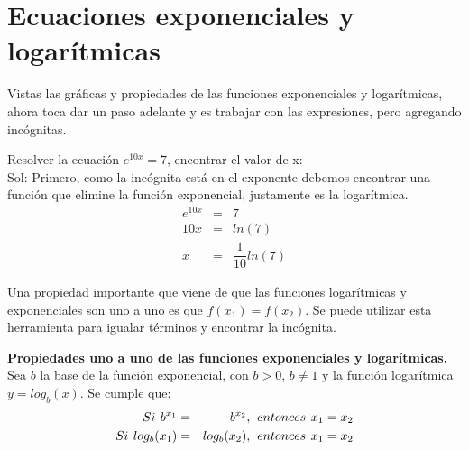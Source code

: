 \section{Ecuaciones exponenciales y logarítmicas}
Vistas las gráficas y propiedades de las funciones exponenciales y logarítmicas, ahora toca dar un paso adelante y es trabajar con las expresiones, pero agregando incógnitas. 

\begin{myexample}
Resolver la ecuación $e^{10x}=7$, encontrar el valor de x:\\

\noindent Sol: Primero, como la incógnita está en el exponente debemos encontrar una función que elimine la función exponencial, justamente es la logarítmica.
\begin{eqnarray*}
e^{10x}&=&7\\
10x&=&ln(7)\\
x&=&\dfrac{1}{10}ln(7)
\end{eqnarray*}
\end{myexample}

Una propiedad importante que viene de que las funciones logarítmicas y exponenciales son uno a uno es que $f(x_{1})=f(x_{2})$. Se puede utilizar esta herramienta para igualar términos y encontrar la incógnita.

\begin{mydef}
\textbf{Propiedades uno a uno de las funciones exponenciales y logarítmicas.} Sea $b$ la base de la función exponencial, con $b>0$, $b\neq 1$ y la función logarítmica $y=log_{b}(x)$. Se cumple que:
\begin{eqnarray}
Si\hspace{4px} b^{x_{1}} &=& b^{x_{2}},\hspace{4px} entonces\hspace{4px} x_{1}=x_{2}\\
Si\hspace{4px} log_{b}(x_{1})&=&log_{b}(x_{2}),\hspace{4px} entonces\hspace{4px} x_{1}=x_{2}
\end{eqnarray}
\end{mydef}

